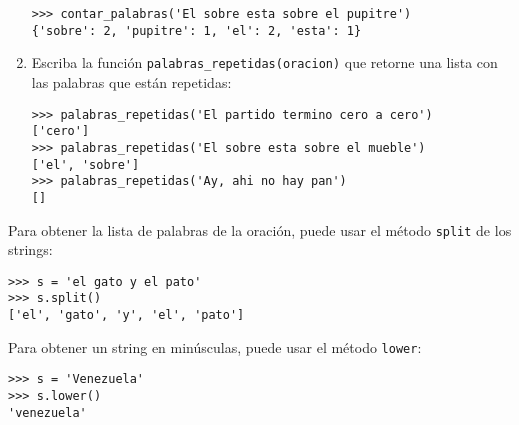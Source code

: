 \begin{enumerate}
\begin{lstlisting}
>>> contar_palabras('El sobre esta sobre el pupitre')
{'sobre': 2, 'pupitre': 1, 'el': 2, 'esta': 1}
\end{lstlisting}
\item
  Escriba la función \lstinline!palabras_repetidas(oracion)! que retorne
  una lista con las palabras que están repetidas:

\begin{lstlisting}
>>> palabras_repetidas('El partido termino cero a cero')
['cero']
>>> palabras_repetidas('El sobre esta sobre el mueble')
['el', 'sobre']
>>> palabras_repetidas('Ay, ahi no hay pan')
[]
\end{lstlisting}
\end{enumerate}
Para obtener la lista de palabras de la oración, puede usar el método
\lstinline!split! de los strings:
\begin{lstlisting}
>>> s = 'el gato y el pato'
>>> s.split()
['el', 'gato', 'y', 'el', 'pato']
\end{lstlisting}
Para obtener un string en minúsculas, puede usar el método
\lstinline!lower!:
\begin{lstlisting}
>>> s = 'Venezuela'
>>> s.lower()
'venezuela'
\end{lstlisting}

